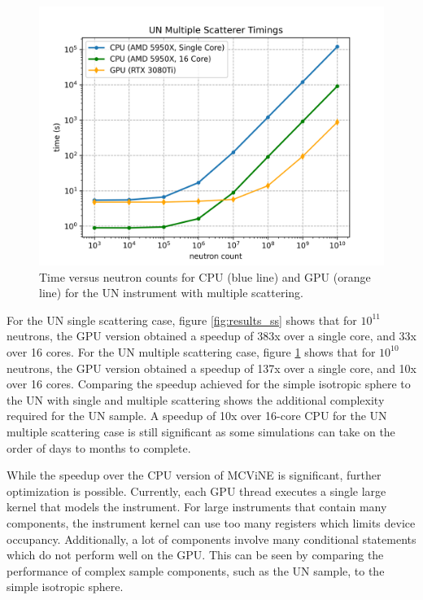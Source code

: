 \begin{figure}[h]
    \centering
    \includegraphics[width=\columnwidth]{figures/mcvine_un_ms_timings.png}
    \caption{Time versus neutron counts for CPU (blue line) and GPU (orange line) for the UN instrument with multiple scattering.}
    \label{fig:results_ms}
\end{figure}

For the UN single scattering case, figure \ref{fig:results_ss} shows that for $10^{11}$ neutrons, the GPU version obtained a speedup of 383x over a single core, and 33x over 16 cores. For the UN multiple scattering case, figure \ref{fig:results_ms} shows that for $10^{10}$ neutrons, the GPU version obtained a speedup of 137x over a single core, and 10x over 16 cores. Comparing the speedup achieved for the simple isotropic sphere to the UN with single and multiple scattering shows the additional complexity required for the UN sample. A speedup of 10x over 16-core CPU for the UN multiple scattering case is still significant as some simulations can take on the order of days to months to complete.

While the speedup over the CPU version of MCViNE is significant, further optimization is possible. Currently, each GPU thread executes a single large kernel that models the instrument. For large instruments that contain many components, the instrument kernel can use too many registers which limits device occupancy. Additionally, a lot of components involve many conditional statements which do not perform well on the GPU. This can be seen by comparing the performance of complex sample components, such as the UN sample, to the simple isotropic sphere.

